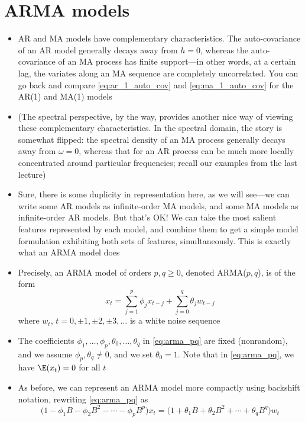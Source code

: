 \documentclass{article}
\begin{document}
\section{ARMA models}

\begin{itemize}
\item AR and MA models have complementary characteristics. The auto-covariance
  of an AR model generally decays away from $h=0$, whereas the auto-covariance
  of an MA process has finite support---in other words, at a certain lag, the
  variates along an MA sequence are completely uncorrelated. You can go back and
  compare \eqref{eq:ar_1_auto_cov} and \eqref{eq:ma_1_auto_cov} for the AR(1)
  and MA(1) models

\item (The spectral perspective, by the way, provides another nice way of
  viewing these complementary characteristics. In the spectral domain, the story
  is somewhat flipped: the spectral density of an MA process generally decays
  away from $\omega=0$, whereas that for an AR process can be much more locally
  concentrated around particular frequencies; recall our examples from the last
  lecture) 

\item Sure, there is some duplicity in representation here, as we will see---we
  can write some AR models as infinite-order MA models, and some MA models as  
  infinite-order AR models. But that's OK! We can take the most salient features
  represented by each model, and combine them to get a simple model formulation 
  exhibiting both sets of features, simultaneously. This is exactly what an ARMA
  model does        

\item Precisely, an ARMA model of orders $p,q \geq 0$, denoted ARMA($p,q$), is
  of the form 
  \begin{equation}
  \label{eq:arma_pq}
  x_t = \sum_{j=1}^p \phi_j x_{t-j} + \sum_{j=0}^q \theta_j w_{t-j}  
  \end{equation}
  where $w_t$, $t = 0, \pm 1, \pm 2, \pm 3, \dots$ is a white noise sequence 

\item The coefficients $\phi_1,\dots,\phi_p,\theta_0,\dots,\theta_q$ in
  \eqref{eq:arma_pq} are fixed (nonrandom), and we assume $\phi_p,\theta_q \not=
  0$, and we set $\theta_0 = 1$. Note that in \eqref{eq:arma_pq}, we have
  $\E(x_t) = 0$ for all $t$ 

\item As before, we can represent an ARMA model more compactly using backshift 
  notation, rewriting \eqref{eq:arma_pq} as
  \begin{equation}
  \label{eq:arma_pq_backshift}
  \Big(1 - \phi_1 B - \phi_2 B^2 - \cdots - \phi_p B^p \Big) x_t = 
  \Big(1 + \theta_1 B + \theta_2 B^2 + \cdots + \theta_q B^q \Big) w_t   
  \end{equation}


\end{itemize}
\end{document}
